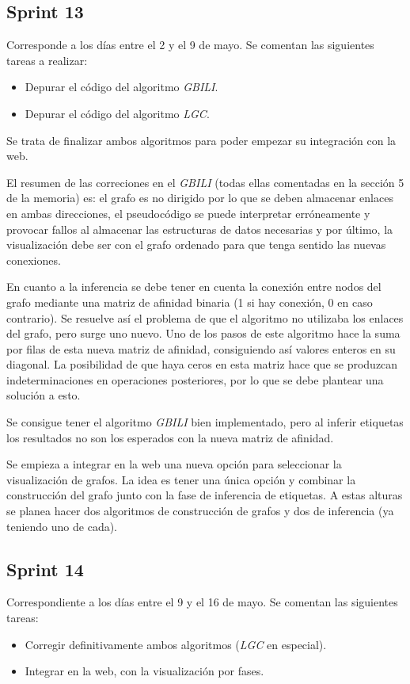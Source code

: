 \subsection{Sprint 13}
Corresponde a los días entre el 2 y el 9 de mayo. Se comentan las siguientes tareas a realizar:
\begin{itemize}
	\item Depurar el código del algoritmo \textit{GBILI}.
	\item Depurar el código del algoritmo \textit{LGC}.
\end{itemize}

Se trata de finalizar ambos algoritmos para poder empezar su integración con la web.

El resumen de las correciones en el \textit{GBILI} (todas ellas comentadas en la sección 5 de la memoria) es: el grafo es no dirigido por lo que se deben almacenar enlaces en ambas direcciones, el pseudocódigo se puede interpretar erróneamente y provocar fallos al almacenar las estructuras de datos necesarias y por último, la visualización debe ser con el grafo ordenado para que tenga sentido las nuevas conexiones.

En cuanto a la inferencia se debe tener en cuenta la conexión entre nodos del grafo mediante una matriz de afinidad binaria (1 si hay conexión, 0 en caso contrario). Se resuelve así el problema de que el algoritmo no utilizaba los enlaces del grafo, pero surge uno nuevo. Uno de los pasos de este algoritmo hace la suma por filas de esta nueva matriz de afinidad, consiguiendo así valores enteros en su diagonal. La posibilidad de que haya ceros en esta matriz hace que se produzcan indeterminaciones en operaciones posteriores, por lo que se debe plantear una solución a esto.

Se consigue tener el algoritmo \textit{GBILI} bien implementado, pero al inferir etiquetas los resultados no son los esperados con la nueva matriz de afinidad.

Se empieza a integrar en la web una nueva opción para seleccionar la visualización de grafos. La idea es tener una única opción y combinar la construcción del grafo junto con la fase de inferencia de etiquetas. A estas alturas se planea hacer dos algoritmos de construcción de grafos y dos de inferencia (ya teniendo uno de cada).

\subsection{Sprint 14}
Correspondiente a los días entre el 9 y el 16 de mayo. Se comentan las siguientes tareas:
\begin{itemize}
	\item Corregir definitivamente ambos algoritmos (\textit{LGC} en especial).
	\item Integrar en la web, con la visualización por fases.
\end{itemize}

